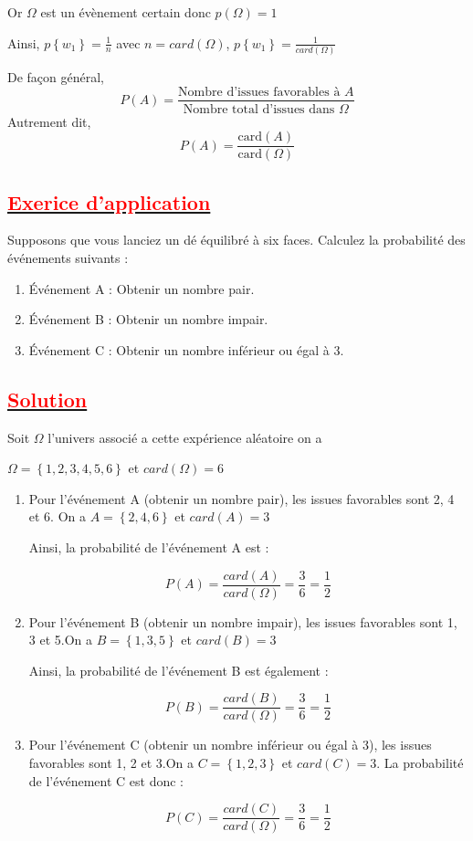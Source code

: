 \documentclass[12pt]{article}
\begin{document}
Or $\Omega$ est un évènement certain donc $p(\Omega)=1$

Ainsi, $p\left\lbrace w_{1} \right\rbrace=\frac{1}{n}$ avec $n=card(\Omega)$, 
$p\left\lbrace w_{1} \right\rbrace=\frac{1}{card(\Omega)}$

De façon général, \[ P(A) = \frac{\text{Nombre d'issues favorables à } A}{\text{Nombre total d'issues dans } \Omega} \]
Autrement dit, \[ P(A) = \frac{\text{card} (A)}{\text{card} (\Omega)} \]
\subsection*{\underline{\textbf{\textcolor{red}{Exerice d'application}}}}
Supposons que vous lanciez un dé équilibré à six faces. Calculez la probabilité des événements suivants :

\begin{enumerate}
    \item Événement A : Obtenir un nombre pair.
    \item Événement B : Obtenir un nombre impair.
    \item Événement C : Obtenir un nombre inférieur ou égal à 3.
\end{enumerate}

\subsection*{\underline{\textbf{\textcolor{red}{Solution}}}}
Soit $\Omega$ l'univers associé a cette expérience aléatoire on a

$\Omega=\left\lbrace 1, 2, 3, 4, 5, 6 \right\rbrace $ et $card(\Omega)=6$ 

\begin{enumerate}
    \item Pour l'événement A (obtenir un nombre pair), les issues favorables sont 2, 4 et 6.
      On a $A=\left\lbrace 2, 4, 6 \right\rbrace $ et $card(A)=3$
          
     Ainsi, la probabilité de l'événement A est :
    
    \[ P(A) =\frac{card(A)}{card(\Omega)}=\frac{3}{6} = \frac{1}{2} \]
    
    \item Pour l'événement B (obtenir un nombre impair), les issues favorables sont 1, 3 et 5.On a $B=\left\lbrace 1, 3, 5 \right\rbrace $ et $card(B)=3$
    
     Ainsi, la probabilité de l'événement B est également :
    
    \[ P(B) =\frac{card(B)}{card(\Omega)}=\frac{3}{6} = \frac{1}{2} \]
    
    \item Pour l'événement C (obtenir un nombre inférieur ou égal à 3), les issues favorables sont 1, 2 et 3.On a $C=\left\lbrace 1, 2, 3 \right\rbrace $ et $card(C)=3$.
    La probabilité de l'événement C est donc :
    
    \[ P(C) =\frac{card(C)}{card(\Omega)}=\frac{3}{6} = \frac{1}{2} \]
\end{enumerate}
\end{document}
